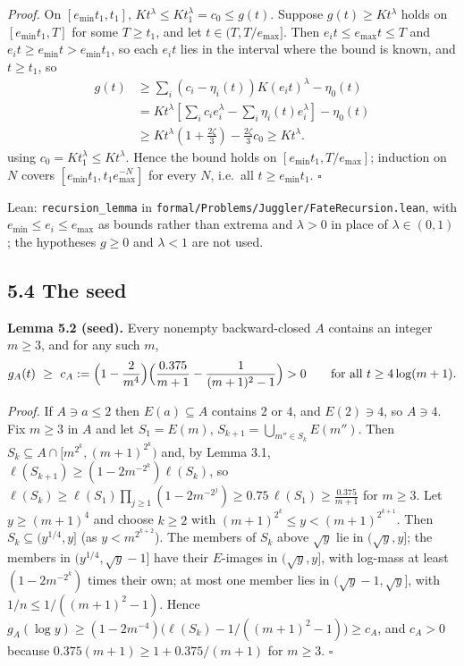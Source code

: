 \documentclass[11pt,a4paper]{article}
\begin{document}
\emph{Proof.} On \([e_{\min}t_1,t_1]\),
\(Kt^\lambda\le Kt_1^\lambda=c_0\le g(t)\). Suppose
\(g(t)\ge Kt^\lambda\) holds on \([e_{\min}t_1,T]\) for some
\(T\ge t_1\), and let \(t\in(T,T/e_{\max}]\). Then
\(e_it\le e_{\max}t\le T\) and \(e_it\ge e_{\min}t>e_{\min}t_1\), so
each \(e_it\) lies in the interval where the bound is known, and
\(t\ge t_1\), so \[
\begin{aligned}
g(t)&\ge\sum_i(c_i-\eta_i(t))K(e_it)^\lambda-\eta_0(t)\\
&=Kt^\lambda\left[\sum_i c_i e_i^\lambda-\sum_i\eta_i(t)e_i^\lambda\right]-\eta_0(t)\\
&\ge Kt^\lambda\left(1+\frac{2\zeta}3\right)-\frac{2\zeta}3c_0
\ge Kt^\lambda.
\end{aligned}
\] using \(c_0=Kt_1^\lambda\le Kt^\lambda\). Hence the bound holds on
\([e_{\min}t_1,T/e_{\max}]\); induction on \(N\) covers
\([e_{\min}t_1,t_1e_{\max}^{-N}]\) for every \(N\), i.e.~all
\(t\ge e_{\min}t_1\). \(\square\)

Lean: \texttt{\nolinkurl{recursion_lemma}} in
\texttt{\nolinkurl{formal/Problems/Juggler/FateRecursion.lean}}, with
\(e_{\min}\le e_i\le e_{\max}\) as bounds rather than extrema and
\(\lambda>0\) in place of \(\lambda\in(0,1)\); the hypotheses \(g\ge 0\)
and \(\lambda<1\) are not used.

\subsection{5.4 The seed}\label{the-seed}

\textbf{Lemma 5.2 (seed).} Every nonempty backward-closed \(A\) contains
an integer \(m\ge 3\), and for any such \(m\), \[
g_A(t)\ \ge\ c_A:=\Bigl(1-\frac2{m^4}\Bigr)\Bigl(\frac{0.375}{m+1}-\frac1{(m+1)^2-1}\Bigr)>0
\qquad\text{for all}\ t\ge 4\log(m+1).
\]

\emph{Proof.} If \(A\ni a\le 2\) then \(E(a)\subseteq A\) contains \(2\)
or \(4\), and \(E(2)\ni 4\), so \(A\ni 4\). Fix \(m\ge 3\) in \(A\) and
let \(S_1=E(m)\), \(S_{k+1}=\bigcup_{m''\in S_k}E(m'')\). Then
\(S_k\subseteq A\cap[m^{2^k},(m+1)^{2^k})\) and, by Lemma 3.1,
\(\ell(S_{k+1})\ge(1-2m^{-2^k})\ell(S_k)\), so
\(\ell(S_k)\ge\ell(S_1)\prod_{j\ge 1}(1-2m^{-2^j})\ge 0.75\,\ell(S_1)\ge\frac{0.375}{m+1}\)
for \(m\ge 3\). Let \(y\ge(m+1)^4\) and choose \(k\ge 2\) with
\((m+1)^{2^k}\le y<(m+1)^{2^{k+1}}\). Then \(S_k\subseteq(y^{1/4},y]\)
(as \(y<m^{2^{k+2}}\)). The members of \(S_k\) above \(\sqrt y\) lie in
\((\sqrt y,y]\); the members in \((y^{1/4},\sqrt y-1]\) have their
\(E\)-images in \((\sqrt y,y]\), with log-mass at least
\((1-2m^{-2^k})\) times their own; at most one member lies in
\((\sqrt y-1,\sqrt y]\), with \(1/n\le 1/((m+1)^2-1)\). Hence
\(g_A(\log y)\ge(1-2m^{-4})\bigl(\ell(S_k)-1/((m+1)^2-1)\bigr)\ge c_A\),
and \(c_A>0\) because \(0.375(m+1)\ge 1+0.375/(m+1)\) for \(m\ge 3\).
\(\square\)
\end{document}
